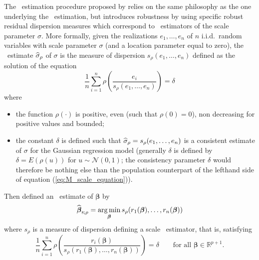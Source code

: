 The ~estimation procedure proposed by \citet{rousseeuw:yohai:1984}
relies on the same philosophy as the one underlying the ~estimation,
but introduces robustness by using specific robust residual dispersion measures
which correspond to ~estimators of the scale parameter $\sigma$. More
formally, given the realizations $e_1, \dots, e_n$ of $n$ i.i.d.\ random
variables with scale parameter $\sigma$ (and a location parameter equal to
zero), the ~estimate $\widehat{\sigma}_{\rho}$ of $\sigma$ is the
measure of dispersion $s_{\rho}(e_1, \dots, e_n)$ defined as the solution
of the equation
%
\begin{equation}\label{eq:M_scale_equation}
    \frac{1}{n}\sum_{i=1}^{n} \rho\left(\frac{e_i}{s_{\rho}(e_1, \dots, e_n)}\right) = \delta
\end{equation}
%
where
\begin{itemize}
    \item the function $\rho(\cdot)$ is positive, even (such that
    $\rho(0) = 0$), non decreasing for positive values and bounded;

    \item the constant $\delta$ is defined such that $\widehat{\sigma}_{\rho} =
    s_{\rho}(e_1, \dots, e_n)$ is a consistent estimate of $\sigma$ for the
    Gaussian regression model (generally $\delta$ is defined by $\delta =
    E(\rho(u))$ for $u \sim \mathcal{N}(0,1)$; the consistency parameter
    $\delta$ would therefore be nothing else than the population counterpart of
    the lefthand side of equation (\ref{eq:M_scale_equation})).
\end{itemize}

Then \citet{rousseeuw:yohai:1984} defined an ~estimate of
$\boldsymbol\beta$ by
\[
    \sthat{\boldsymbol\beta}_{\stsc{S};\rho} 
    = \argmin_{\boldsymbol\beta}s_{\rho} (r_1(\boldsymbol\beta), \dots, r_n(\boldsymbol{\beta}))
\]
where $s_{\rho}$ is a measure of dispersion defining a scale ~estimator, that is,
satisfying
%
\begin{equation}\label{eq:M_scale_equation_res}
    \frac{1}{n}\sum_{i=1}^{n} \rho\left(\frac{r_i(\boldsymbol{\beta})}%
        {s_{\rho}(r_1(\boldsymbol\beta), \dots, r_n(\boldsymbol\beta))}\right) = \delta
    \qquad\text{for all $\boldsymbol\beta \in \mathbb{R}^{p+1}$.}
\end{equation}

